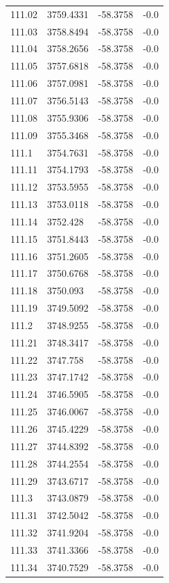 \begin{table}[H]
\begin{tabular}{llll}
111.02 & 3759.4331 & -58.3758 & -0.0 \\
111.03 & 3758.8494 & -58.3758 & -0.0 \\
111.04 & 3758.2656 & -58.3758 & -0.0 \\
111.05 & 3757.6818 & -58.3758 & -0.0 \\
111.06 & 3757.0981 & -58.3758 & -0.0 \\
111.07 & 3756.5143 & -58.3758 & -0.0 \\
111.08 & 3755.9306 & -58.3758 & -0.0 \\
111.09 & 3755.3468 & -58.3758 & -0.0 \\
111.1 & 3754.7631 & -58.3758 & -0.0 \\
111.11 & 3754.1793 & -58.3758 & -0.0 \\
111.12 & 3753.5955 & -58.3758 & -0.0 \\
111.13 & 3753.0118 & -58.3758 & -0.0 \\
111.14 & 3752.428 & -58.3758 & -0.0 \\
111.15 & 3751.8443 & -58.3758 & -0.0 \\
111.16 & 3751.2605 & -58.3758 & -0.0 \\
111.17 & 3750.6768 & -58.3758 & -0.0 \\
111.18 & 3750.093 & -58.3758 & -0.0 \\
111.19 & 3749.5092 & -58.3758 & -0.0 \\
111.2 & 3748.9255 & -58.3758 & -0.0 \\
111.21 & 3748.3417 & -58.3758 & -0.0 \\
111.22 & 3747.758 & -58.3758 & -0.0 \\
111.23 & 3747.1742 & -58.3758 & -0.0 \\
111.24 & 3746.5905 & -58.3758 & -0.0 \\
111.25 & 3746.0067 & -58.3758 & -0.0 \\
111.26 & 3745.4229 & -58.3758 & -0.0 \\
111.27 & 3744.8392 & -58.3758 & -0.0 \\
111.28 & 3744.2554 & -58.3758 & -0.0 \\
111.29 & 3743.6717 & -58.3758 & -0.0 \\
111.3 & 3743.0879 & -58.3758 & -0.0 \\
111.31 & 3742.5042 & -58.3758 & -0.0 \\
111.32 & 3741.9204 & -58.3758 & -0.0 \\
111.33 & 3741.3366 & -58.3758 & -0.0 \\
111.34 & 3740.7529 & -58.3758 & -0.0 \\

\end{tabular}
\end{table}
